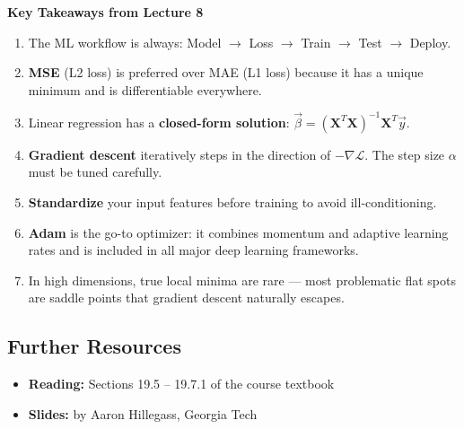 \documentclass[12pt]{article}
\begin{document}
\begin{takeawaybox}
\textbf{Key Takeaways from Lecture 8}
\begin{enumerate}
  \item The ML workflow is always: Model $\to$ Loss $\to$ Train $\to$ Test $\to$ Deploy.
  \item \textbf{MSE} (L2 loss) is preferred over MAE (L1 loss) because it has a unique minimum and is differentiable everywhere.
  \item Linear regression has a \textbf{closed-form solution}: $\vec{\beta} = (\boldsymbol{X}^T\boldsymbol{X})^{-1}\boldsymbol{X}^T\vec{y}$.
  \item \textbf{Gradient descent} iteratively steps in the direction of $-\nabla\mathcal{L}$. The step size $\alpha$ must be tuned carefully.
  \item \textbf{Standardize} your input features before training to avoid ill-conditioning.
  \item \textbf{Adam} is the go-to optimizer: it combines momentum and adaptive learning rates and is included in all major deep learning frameworks.
  \item In high dimensions, true local minima are rare --- most problematic flat spots are saddle points that gradient descent naturally escapes.
\end{enumerate}
\end{takeawaybox}

\subsection{Further Resources}
\begin{itemize}
  \item \textbf{Reading:} Sections 19.5 -- 19.7.1 of the course textbook
  \item \textbf{Slides:} by Aaron Hillegass, Georgia Tech
\end{itemize}
\end{document}
